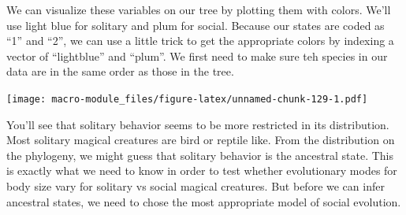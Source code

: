 \documentclass[]{book}
\newenvironment{Shaded}{\begin{snugshade}}{\end{snugshade}}
\newcommand{\KeywordTok}[1]{\textcolor[rgb]{0.13,0.29,0.53}{\textbf{{#1}}}}
\newcommand{\DataTypeTok}[1]{\textcolor[rgb]{0.13,0.29,0.53}{{#1}}}
\newcommand{\DecValTok}[1]{\textcolor[rgb]{0.00,0.00,0.81}{{#1}}}
\newcommand{\FloatTok}[1]{\textcolor[rgb]{0.00,0.00,0.81}{{#1}}}
\newcommand{\StringTok}[1]{\textcolor[rgb]{0.31,0.60,0.02}{{#1}}}
\newcommand{\CommentTok}[1]{\textcolor[rgb]{0.56,0.35,0.01}{\textit{{#1}}}}
\newcommand{\NormalTok}[1]{{#1}}
\begin{document}
We can visualize these variables on our tree by plotting them with
colors. We'll use light blue for solitary and plum for social. Because
our states are coded as ``1'' and ``2'', we can use a little trick to
get the appropriate colors by indexing a vector of ``lightblue'' and
``plum''. We first need to make sure teh species in our data are in the
same order as those in the tree.

\begin{Shaded}
\end{Shaded}

\texttt{[image: macro-module\_files/figure-latex/unnamed-chunk-129-1.pdf]}

You'll see that solitary behavior seems to be more restricted in its
distribution. Most solitary magical creatures are bird or reptile like.
From the distribution on the phylogeny, we might guess that solitary
behavior is the ancestral state. This is exactly what we need to know in
order to test whether evolutionary modes for body size vary for solitary
vs social magical creatures. But before we can infer ancestral states,
we need to chose the most appropriate model of social evolution.
\end{document}
